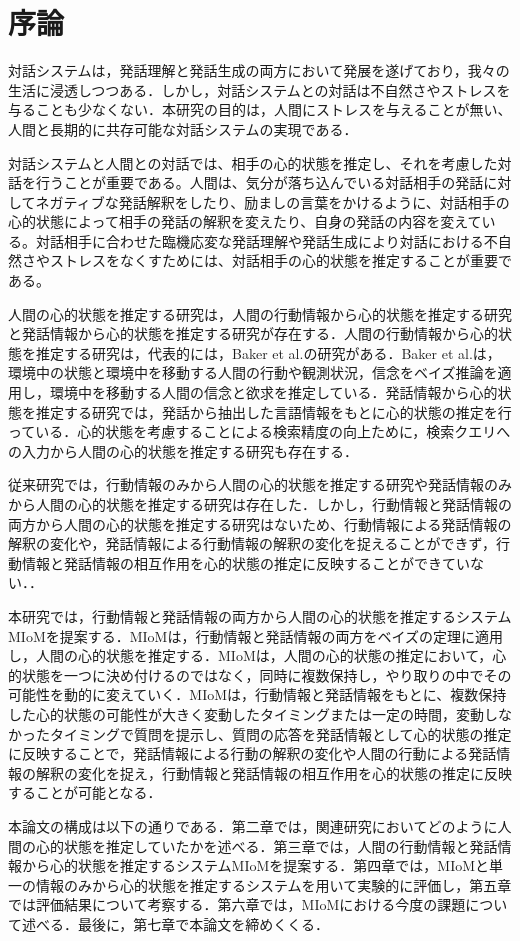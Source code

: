 \chapter{序論}

\par
対話システムは，発話理解と発話生成の両方において発展を遂げており，我々の生活に浸透しつつある．しかし，対話システムとの対話は不自然さやストレスを与ることも少なくない．本研究の目的は，人間にストレスを与えることが無い、人間と長期的に共存可能な対話システムの実現である．

\par
対話システムと人間との対話では、相手の心的状態を推定し、それを考慮した対話を行うことが重要である。人間は、気分が落ち込んでいる対話相手の発話に対してネガティブな発話解釈をしたり、励ましの言葉をかけるように、対話相手の心的状態によって相手の発話の解釈を変えたり、自身の発話の内容を変えている。対話相手に合わせた臨機応変な発話理解や発話生成により対話における不自然さやストレスをなくすためには、対話相手の心的状態を推定することが重要である。

\par
人間の心的状態を推定する研究は，人間の行動情報から心的状態を推定する研究と発話情報から心的状態を推定する研究が存在する．人間の行動情報から心的状態を推定する研究は，代表的には，Baker et al.の研究がある．Baker et al.は，環境中の状態と環境中を移動する人間の行動や観測状況，信念をベイズ推論を適用し，環境中を移動する人間の信念と欲求を推定している．発話情報から心的状態を推定する研究では，発話から抽出した言語情報をもとに心的状態の推定を行っている．心的状態を考慮することによる検索精度の向上ために，検索クエリへの入力から人間の心的状態を推定する研究も存在する．

\par
従来研究では，行動情報のみから人間の心的状態を推定する研究や発話情報のみから人間の心的状態を推定する研究は存在した．しかし，行動情報と発話情報の両方から人間の心的状態を推定する研究はないため、行動情報による発話情報の解釈の変化や，発話情報による行動情報の解釈の変化を捉えることができず，行動情報と発話情報の相互作用を心的状態の推定に反映することができていない．．

\par
本研究では，行動情報と発話情報の両方から人間の心的状態を推定するシステムMIoMを提案する．MIoMは，行動情報と発話情報の両方をベイズの定理に適用し，人間の心的状態を推定する．MIoMは，人間の心的状態の推定において，心的状態を一つに決め付けるのではなく，同時に複数保持し，やり取りの中でその可能性を動的に変えていく．MIoMは，行動情報と発話情報をもとに、複数保持した心的状態の可能性が大きく変動したタイミングまたは一定の時間，変動しなかったタイミングで質問を提示し、質問の応答を発話情報として心的状態の推定に反映することで，発話情報による行動の解釈の変化や人間の行動による発話情報の解釈の変化を捉え，行動情報と発話情報の相互作用を心的状態の推定に反映することが可能となる．

\par
本論文の構成は以下の通りである．第二章では，関連研究においてどのように人間の心的状態を推定していたかを述べる．第三章では，人間の行動情報と発話情報から心的状態を推定するシステムMIoMを提案する．第四章では，MIoMと単一の情報のみから心的状態を推定するシステムを用いて実験的に評価し，第五章では評価結果について考察する．第六章では，MIoMにおける今度の課題について述べる．最後に，第七章で本論文を締めくくる．
